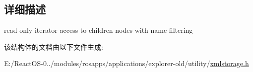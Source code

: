 \subsection{详细描述}
read only iterator access to children nodes with name filtering 

该结构体的文档由以下文件生成\+:\begin{DoxyCompactItemize}
\item 
E\+:/\+React\+O\+S-\/0../modules/rosapps/applications/explorer-\/old/utility/\hyperlink{xmlstorage_8h}{xmlstorage.\+h}\end{DoxyCompactItemize}
